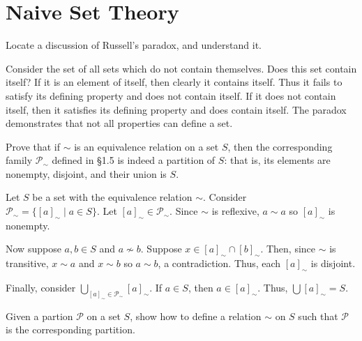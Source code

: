 \documentclass[../../master.tex]{subfiles}
\begin{document}
\section{Naive Set Theory}

  \begin{problem}
    Locate a discussion of Russell's paradox, and understand it.
  \end{problem}

  \begin{solution}
    Consider the set of all sets which do not contain themselves.
    Does this set contain itself? If it is an element of itself, then clearly it
    contains itself. Thus it fails to satisfy its defining property and does not
    contain itself. If it does not contain itself, then it satisfies its defining
    property and does contain itself. The paradox demonstrates that not all
    properties can define a set.
  \end{solution}

  \begin{problem}
    Prove that if \(\sim\) is an equivalence relation on a set \(S\), then the
    corresponding family \(\mathscr{P}_{\sim}\) defined in \S 1.5 is indeed a
    partition of \(S\): that is, its elements are nonempty, disjoint, and their
    union is \(S\).
  \end{problem}

  \begin{solution}
    Let \(S\) be a set with the equivalence relation \(\sim\). Consider \\
    \(\mathscr{P}_{\sim} = \{[a]_{\sim} \mid a \in S \}\). Let \([a]_{\sim} \in
    \mathscr{P}_{\sim}\). Since \(\sim\) is reflexive, \(a \sim a\) so
    \([a]_{\sim}\) is nonempty.

    Now suppose \(a, b \in S\) and \(a \nsim b\). Suppose \(x \in [a]_{\sim}
    \cap [b]_{\sim}\). Then, since \(\sim\) is transitive, \(x \sim a\) and
    \(x \sim b\) so \(a \sim b\), a contradiction. Thus, each \([a]_{\sim}\) is
    disjoint.

    Finally, consider \(\bigcup_{[a]_{\sim} \in \mathscr{P}_{\sim}} [a]_{\sim}\). If \(a \in S\), then \(a \in
    [a]_{\sim}\). Thus, \(\bigcup [a]_{\sim} = S\).
  \end{solution}

  \begin{problem}
    Given a partion \(\mathscr{P}\) on a set \(S\), show how to define a
    relation \(\sim\) on \(S\) such that \(\mathscr{P}\) is the corresponding
    partition.
  \end{problem}
\end{document}
